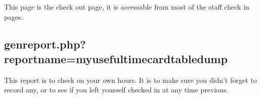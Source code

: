 \documentclass[tablesignature]{scrartcl}
\begin{document}
\label{VolunteerCheckOut.php}

   This page is the check out page, it is accessable from most of the
   staff check in pages.
\subsection{genreport.php?reportname=myusefultimecardtabledump}
\label{sec-4_3}

\label{genreport.php?reportname=myusefultimecardtabledump}

   This report is to check on your own hours.  It is to make sure you
   didn't forget to record any, or to see if you left yourself checked
   in at any time previous.
\end{document}
